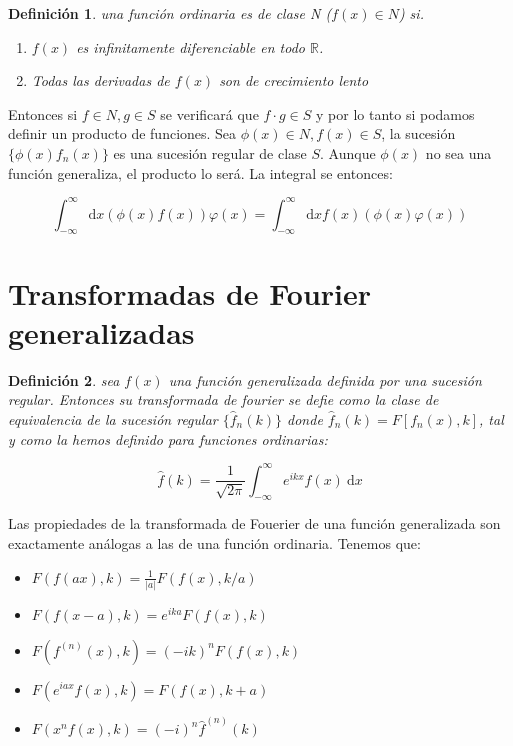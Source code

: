\documentclass[12pt,a4paper]{book}
\newcommand{\D}{\mathrm{d}}
\newcommand{\inti}{\int_{-\infty}^{\infty}}
\newcommand{\hatf}{\widehat{f}}
\newtheorem{definicion}{Definición}[section]
\begin{document}
\begin{definicion}
una función ordinaria es de clase N ($f(x) \in N$) si.

\begin{enumerate}
\item $f(x)$ es infinitamente diferenciable en todo $\mathbb{R}$.
\item Todas las derivadas de $f(x)$ son de crecimiento lento 
\end{enumerate}

\end{definicion}

Entonces si $f \in N, g \in S$ se verificará que $f \cdot g \in S$ y por lo tanto si podamos definir un producto de funciones. Sea $\phi (x) \in N, f (x) \in S$, la sucesión $\{ \phi (x) f_n (x) \}$ es una sucesión regular de clase $S$. Aunque $\phi (x)$ no sea una función generaliza, el producto lo será. La integral se entonces:

\begin{equation}
\inti \D x (\phi (x) f(x)) \varphi (x) = \inti \D x f(x) (\phi (x) \varphi (x)) 
\end{equation}


\section{Transformadas de Fourier generalizadas}


\begin{definicion}
sea $f(x)$ una función generalizada definida por una sucesión regular. Entonces su transformada de fourier se defie como la clase de equivalencia de la sucesión regular $\{ \hatf_n (k) \}$ donde $\hatf_n (k) = F [f_n (x),k]$, tal y como la hemos definido para funciones ordinarias:

\begin{equation}
\hatf (k) = \dfrac{1}{\sqrt{2 \pi}} \inti  e^{ikx} f(x) \ \D x
\end{equation}
\end{definicion}

Las propiedades de la transformada de Fouerier de una función generalizada son exactamente análogas a las de una función ordinaria. Tenemos que:

\begin{itemize}
\item $ F(f(ax),k) = \frac{1}{|a|} F(f(x), k/a) $ \\

\item $ F(f(x-a),k) = e^{ika} F(f(x),k)$ \\

\item $ F(f^{(n)}(x),k ) = (-ik)^n F(f(x),k)$ \\

\item $ F(e^{iax} f(x),k) = F(f(x),k+a)$ \\

\item $ F( x^n f(x),k) = (-i)^n \hatf^{(n)} (k) $
\end{itemize}
\end{document}
